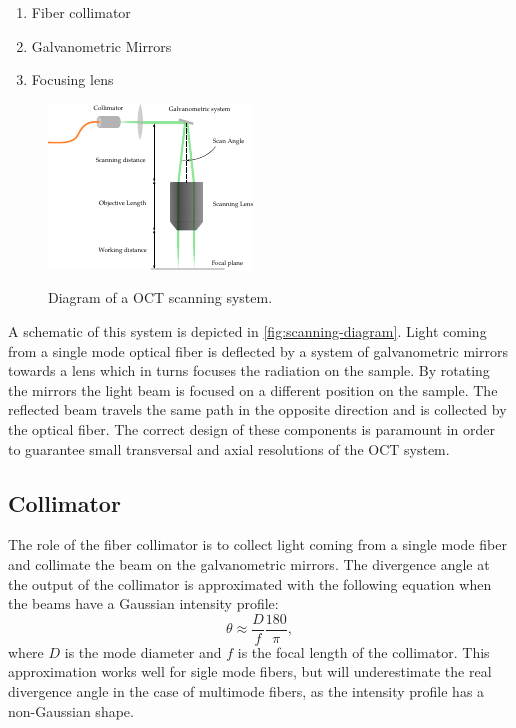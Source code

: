 \begin{enumerate}
	\item Fiber collimator
	\item Galvanometric Mirrors
	\item Focusing lens
\end{enumerate}

\begin{figure}[bth]
	\myfloatalign
	{\includegraphics[width=0.8\linewidth]{gfx/setup-diagrams/scanning-diagram.pdf}}
	\caption{Diagram of a OCT scanning system.}\label{fig:scanning-diagram}
\end{figure}

A schematic of this system is depicted in \autoref{fig:scanning-diagram}. Light coming from a single mode optical fiber is deflected by a system of galvanometric mirrors towards a lens which in turns focuses the radiation on the sample. By rotating the mirrors the light beam is focused on a different position on the sample. The reflected beam travels the same path in the opposite direction and is collected by the optical fiber. The correct design of these components is paramount in order to guarantee small transversal and axial resolutions of the OCT system. 



\subsection{Collimator}
The role of the fiber collimator is to collect light coming from a single mode fiber and collimate the beam on the galvanometric mirrors. The divergence angle at the output of the collimator is approximated with the following equation when the beams have a Gaussian intensity profile:
\begin{equation}
	\theta \approx \frac{D}{f} \frac{180}{\pi},
\end{equation}
where $D$ is the mode diameter and $f$ is the focal length of the collimator. This approximation works well for sigle mode fibers, but will underestimate the real divergence angle in the case of multimode fibers, as the intensity profile has a non-Gaussian shape. 


